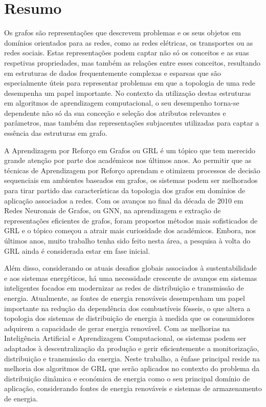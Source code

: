 \chapter*{Resumo}

Os grafos são representações que descrevem problemas e os seus objetos em domínios orientados para as redes, como as redes elétricas, os transportes ou as redes sociais. Estas representações podem captar não só os conceitos e as suas respetivas propriedades, mas também as relações entre esses conceitos, resultando em estruturas de dados frequentemente complexas e esparsas que são especialmente úteis para representar problemas em que a topologia de uma rede desempenha um papel importante. No contexto da utilização destas estruturas em algoritmos de aprendizagem computacional, o seu desempenho torna-se dependente não só da sua conceção e seleção dos atributos relevantes e parâmetros, mas também das representações subjacentes utilizadas para captar a essência das estruturas em grafo. \par
A Aprendizagem por Reforço em Grafos ou \acf{GRL} é um tópico que tem merecido grande atenção por parte dos académicos nos últimos anos. Ao permitir que as técnicas de Aprendizagem por Reforço aprendam e otimizem processos de decisão sequenciais em ambientes baseados em grafos, os sistemas podem ser melhorados para tirar partido das características da topologia dos grafos em domínios de aplicação associados a redes. Com os avanços no final da década de 2010 em Redes Neuronais de Grafos, ou \acf{GNN}, na aprendizagem e extração de representações eficientes de grafos, foram propostos métodos mais sofisticados de \ac{GRL} e o tópico começou a atrair mais curiosidade dos académicos. Embora, nos últimos anos, muito trabalho tenha sido feito nesta área, a pesquisa à volta do \ac{GRL} ainda é considerada estar em fase inicial. \par
Além disso, considerando os atuais desafios globais associados à sustentabilidade e aos sistemas energéticos, há uma necessidade crescente de avanços em sistemas inteligentes focados em modernizar as redes de distribuição e transmissão de energia. Atualmente, as fontes de energia renováveis desempenham um papel importante na redução da dependência dos combustíveis fósseis, o que altera a topologia dos sistemas de distribuição de energia à medida que os consumidores adquirem a capacidade de gerar energia renovável. Com as melhorias na Inteligência Artificial e Aprendizagem Computacional, os sistemas podem ser adaptados à descentralização da produção e gerir eficientemente a monitorização, distribuição e transmissão da energia. Neste trabalho, a ênfase principal reside na melhoria dos algoritmos de \ac{GRL} que serão aplicados no contexto  do problema da distribuição dinâmica e económica de energia como o seu principal domínio de aplicação, considerando fontes de energia renováveis e sistemas de armazenamento de energia.  \par
